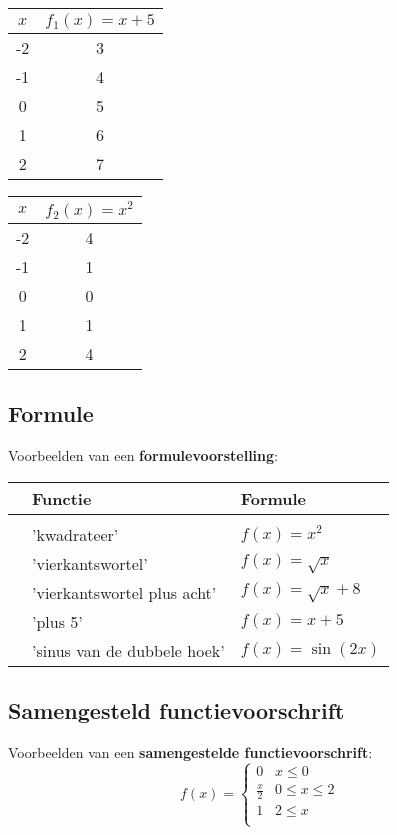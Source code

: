 \documentclass{ximera}
\begin{document}
\begin{center}
    \begin{tabular}[t]{| c | c |}
        \hline
        $x$   &  $f_1(x) = x + 5$  \\
        \hline
        -2   & 3  \\
        -1   & 4  \\
        0    & 5  \\
        1    & 6  \\
        2    & 7  \\
        \hline
        
    \end{tabular}
    \qquad 
    \begin{tabular}[t]{| c | c |}
        \hline
        $x$   &  $f_2(x) = x^2$ \\
        \hline
        -2   &  4 \\
        -1   &  1 \\
        0    &  0 \\
        1    &  1 \\
        2    &  4 \\
        \hline
    \end{tabular}
\end{center}


\subsection{Formule}
Voorbeelden van een \textbf{formulevoorstelling}:


\begin{tabular}[t]{l l l}
    & Functie   &  Formule \\
    \hline \\
    & 'kwadrateer'                & $f(x) = x^2$ \\
    & 'vierkantswortel'           & $f(x) = \sqrt{x}$ \\
    & 'vierkantswortel plus acht' & $f(x) = \sqrt{x} + 8$ \\
    & 'plus 5'                    & $f(x) = x + 5$ \\
    & 'sinus van de dubbele hoek' & $f(x) = \sin(2x)$ \\
\end{tabular}


\subsection{Samengesteld functievoorschrift}
Voorbeelden van een \textbf{samengestelde functievoorschrift}:
\[  f(x) =  \left\{
\begin{array}{ll}
0 & x\leq 0 \\
\frac{x}{2} & 0 \leq x\leq 2 \\
1 & 2\leq x \\
\end{array} 
\right. \]
\end{document}
